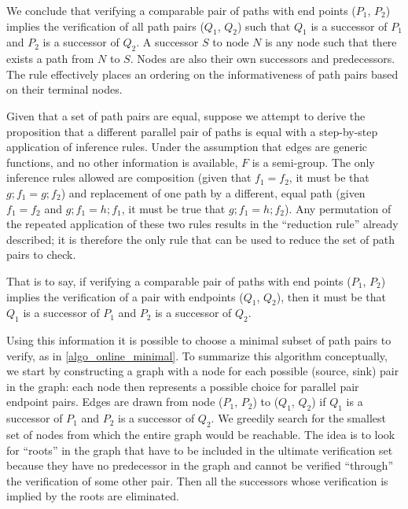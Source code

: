 \documentclass[sigplan,review,nonacm=true]{acmart}
\begin{document}
We conclude that verifying a comparable pair of paths with end points ($P_1$, $P_2$) implies the verification of all path pairs ($Q_1$, $Q_2$) such that $Q_1$ is a successor of $P_1$ and $P_2$ is a successor of $Q_2$. A successor $S$ to node $N$ is any node such that there exists a path from $N$ to $S$. Nodes are also their own successors and predecessors.
The rule effectively places an ordering on the informativeness of path pairs based on their terminal nodes.

Given that a set of path pairs are equal, suppose we attempt to derive the proposition that a different parallel pair of paths is equal with a step-by-step application of inference rules.
 Under the assumption that edges are generic functions, and no other information is available, $F$ is a semi-group.
 The only inference rules allowed are composition (given that $f_1=f_2$, it must be that $g ; f_1 = g ; f_2$) and replacement of one path by a different, equal path (given $f_1=f_2$ and $g ; f_1 = h ; f_1 $, it must be true that $g ; f_1 = h ; f_2$). Any permutation of the repeated application of these two rules results in the ``reduction rule'' already described; it is therefore the only rule that can be used to reduce the set of path pairs to check.

That is to say, if verifying a comparable pair of paths with end points ($P_1$, $P_2$) implies the verification of a pair with endpoints ($Q_1$, $Q_2$), then it must be that $Q_1$ is a successor of $P_1$ and $P_2$ is a successor of $Q_2$. %

Using this information it is possible to choose a minimal subset of path pairs to verify, as in \ref{algo_online_minimal}.
%
To summarize this algorithm conceptually, we start by constructing a graph with a node for each possible (source, sink) pair in the graph: each node then represents a possible choice for parallel pair endpoint pairs. Edges are drawn from node ($P_1$, $P_2$) to ($Q_1$, $Q_2$) if $Q_1$ is a successor of $P_1$ and $P_2$ is a successor of $Q_2$. We greedily search for the smallest set of nodes from which the entire graph would be reachable. The idea is to look for ``roots'' in the graph that have to be included in the ultimate verification set because they have no predecessor in the graph and cannot be verified ``through'' the verification of some other pair. Then all the successors whose verification is implied by the roots are eliminated.
\end{document}
